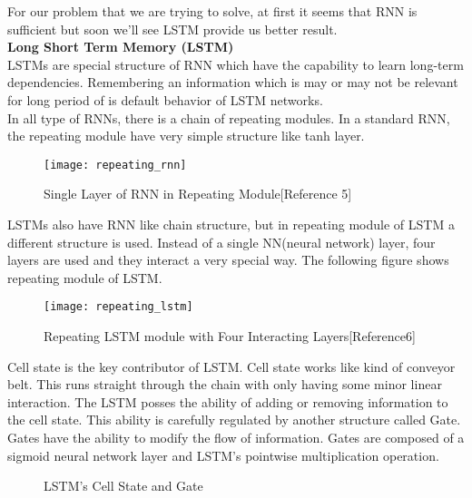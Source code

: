 For our problem that we are trying to solve, at first it seems that RNN is sufficient but soon we'll see LSTM provide us better result. \\

\textbf{Long Short Term Memory (LSTM)} \\
LSTMs are special structure of RNN which have the capability to learn long-term dependencies. Remembering an information which is may or may not be relevant for long period of is default behavior of LSTM networks. \\

In all type of RNNs, there is a chain of repeating modules. In a standard RNN, the repeating module have very simple structure like tanh layer. \\

\begin{figure}[h]
    \centering
    \texttt{[image: repeating\_rnn]}
    \caption{Single Layer of RNN in Repeating Module[Reference 5]}
\end{figure}
\vline

LSTMs also have RNN like chain structure, but in repeating module of LSTM a different structure is used. Instead of a single NN(neural network) layer, four layers are used and they interact a very special way. The following figure shows repeating module of LSTM. \\

\begin{figure}[h]
    \centering
    \texttt{[image: repeating\_lstm]}
    \caption{Repeating LSTM module with Four Interacting Layers[Reference6]}
\end{figure}
\vline

Cell state is the key contributor of LSTM. Cell state works like kind of conveyor belt. This runs straight through the chain with only having some minor linear interaction. The LSTM posses the ability of adding or removing information to the cell state. This ability is carefully regulated by another structure called Gate. \\

Gates have the ability to modify the flow of information. Gates are composed of a sigmoid neural network layer and LSTM's pointwise multiplication operation. \\

\begin{figure}%
    \centering
    \qquad
    \caption{LSTM's Cell State and Gate}%
\end{figure}
\vline

